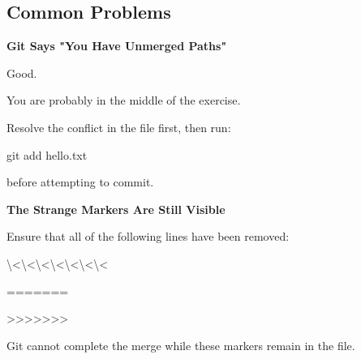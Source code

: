 \documentclass{csc2059practical}
\begin{document}
\subsection{Common Problems}
\begin{commonerror}
\textbf{Git Says "You Have Unmerged Paths"}\par
\medskip

Good.


You are probably in the middle of the exercise.


Resolve the conflict in the file first, then run:


\end{commonerror}
\begin{terminalplain}
git add hello.txt
\end{terminalplain}
before attempting to commit.

\begin{commonerror}
\textbf{The Strange Markers Are Still Visible}\par
\medskip

Ensure that all of the following lines have been removed:


\textbackslash{}<\textbackslash{}<\textbackslash{}<\textbackslash{}<\textbackslash{}<\textbackslash{}<\textbackslash{}<


\end{commonerror}
\begin{terminalplain}
=======
\end{terminalplain}
>>>>>>>

Git cannot complete the merge while these markers remain in the file.
\end{document}
